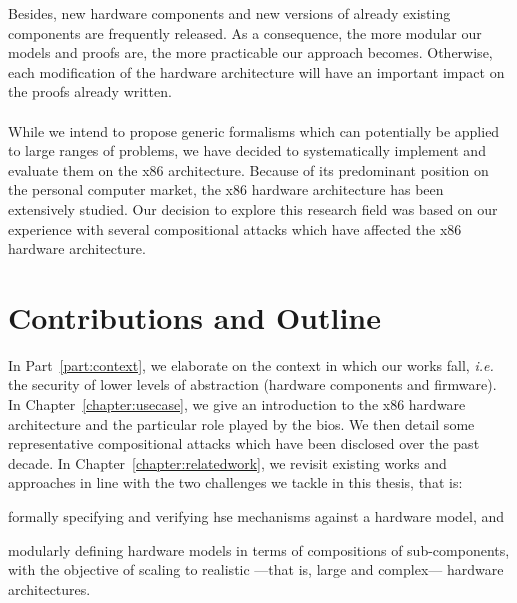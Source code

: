 Besides, new hardware components and new versions of already existing components
are frequently released.
%
As a consequence, the more modular our models and proofs are, the more
practicable our approach becomes.
%
Otherwise, each modification of the hardware architecture will have an important
impact on the proofs already written.

\paragraph{}
%
While we intend to propose generic formalisms which can potentially be applied
to large ranges of problems, we have decided to systematically implement and
evaluate them on the x86 architecture.
%
Because of its predominant position on the personal computer market, the x86
hardware architecture has been extensively studied.
%
Our decision to explore this research field was based on our experience with
several compositional attacks which have affected the x86 hardware architecture.

\section{Contributions and Outline}


In Part~\ref{part:context}, we elaborate on the context in which our works fall, \emph{i.e.} the security of lower levels of abstraction (hardware components and firmware).
%
In Chapter~\ref{chapter:usecase}, we give an introduction to the x86 hardware
architecture and the particular role played by the \ac{bios}.
%
We then detail some representative compositional attacks which have
been disclosed over the past decade.
%
%
In Chapter~\ref{chapter:relatedwork}, we revisit existing works  and approaches
in line with the two challenges we tackle in this thesis, that is:
%
\begin{inparaenum}[(1)]
\item formally specifying and verifying \ac{hse} mechanisms against a hardware
  model, and
%
\item modularly defining hardware models in terms of compositions of
  sub-components, with the objective of scaling to realistic ---that is, large
  and complex--- hardware architectures.
\end{inparaenum}

